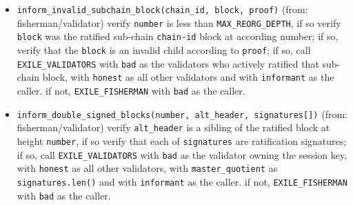 \begin{itemize}
\tightlist
\item
  \texttt{inform\_invalid\_subchain\_block(chain\_id,\ block,\ proof)}
  (from: fisherman/validator) verify \texttt{number} is less than
  \texttt{MAX\_REORG\_DEPTH}, if so verify \texttt{block} was the
  ratified sub-chain \texttt{chain-id} block at according number; if so,
  verify that the \texttt{block} is an invalid child according to
  \texttt{proof}; if so, call \texttt{EXILE\_VALIDATORS} with
  \texttt{bad} as the validators who actively ratified that sub-chain
  block, with \texttt{honest} as all other validators and with
  \texttt{informant} as the caller. if not, \texttt{EXILE\_FISHERMAN}
  with \texttt{bad} as the caller.\\
\item
  \texttt{inform\_double\_signed\_blocks(number,\ alt\_header,\ signatures{[}{]})}
  (from: fisherman/validator) verify \texttt{alt\_header} is a sibling
  of the ratified block at height \texttt{number}, if so verify that
  each of \texttt{signatures} are ratification signatures; if so, call
  \texttt{EXILE\_VALIDATORS} with \texttt{bad} as the validator owning
  the session key, with \texttt{honest} as all other validators, with
  \texttt{master\_quotient} as \texttt{signatures.len()} and with
  \texttt{informant} as the caller. if not, \texttt{EXILE\_FISHERMAN}
  with \texttt{bad} as the caller.
\end{itemize}

